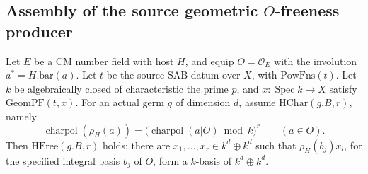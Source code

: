 \subsection{Assembly of the source geometric \(O\)-freeness producer}
\label{subsec:faithful-geometric-hfree-assembly}

\begin{srtheorem}
\label{thm:faithful-geometric-hfree}
Let \(E\) be a CM number field with host \(H\), and equip
\(O=\mathcal O_E\) with the involution \(a^*=H.\mathrm{bar}(a)\).
Let \(t\) be the source \(\mathrm{SAB}\) datum over \(X\), with
\(\mathrm{PowFns}(t)\).
Let \(k\) be algebraically closed of characteristic the
prime \(p\), and \(x:\operatorname{Spec}k\to X\) satisfy
\(\mathrm{GeomPF}(t,x)\).
For an actual germ \(g\) of dimension \(d\), assume
\(\mathrm{HChar}(g.B,r)\), namely
\[
 \operatorname{charpol}(\rho_H(a))
   =\bigl(\operatorname{charpol}(a|O)\bmod k\bigr)^r
                            \qquad(a\in O).
 \tag{HF1}\label{eq:faithful-hfree-character}
\]
Then \(\mathrm{HFree}(g.B,r)\) holds:
there are \(x_1,\ldots,x_r\in k^d\oplus k^d\) such that
\(\rho_H(b_j)x_l\), for the specified integral basis \(b_j\)
of \(O\), form a \(k\)-basis of \(k^d\oplus k^d\).
\end{srtheorem}

